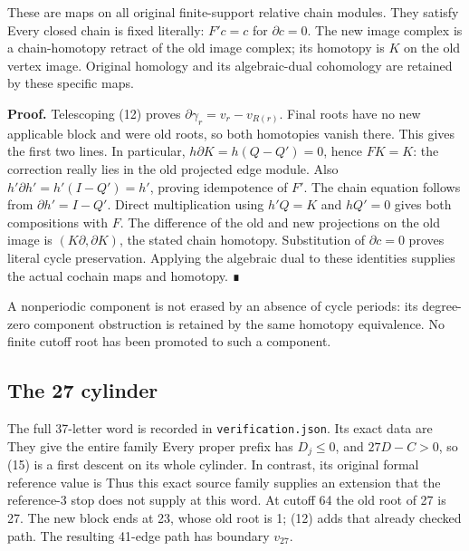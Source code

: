 These are maps on all original finite-support relative chain modules.
They satisfy
Every closed chain is fixed literally: \(F'c=c\) for \(\partial c=0\).
The new image complex is a chain-homotopy retract of the old image
complex; its homotopy is \(K\) on the old vertex image. Original
homology and its algebraic-dual cohomology are retained by these
specific maps.

\textbf{Proof.} Telescoping (12) proves
\(\partial\gamma_r=v_r-v_{R(r)}\). Final roots have no new applicable
block and were old roots, so both homotopies vanish there. This gives
the first two lines. In particular, \(h\partial K=h(Q-Q')=0\), hence
\(FK=K\): the correction really lies in the old projected edge module.
Also \(h'\partial h'=h'(I-Q')=h'\), proving idempotence of \(F'\). The
chain equation follows from \(\partial h'=I-Q'\). Direct multiplication
using \(h'Q=K\) and \(hQ'=0\) gives both compositions with \(F\). The
difference of the old and new projections on the old image is
\((K\partial,\partial K)\), the stated chain homotopy. Substitution of
\(\partial c=0\) proves literal cycle preservation. Applying the
algebraic dual to these identities supplies the actual cochain maps and
homotopy. ∎

A nonperiodic component is not erased by an absence of cycle periods:
its degree-zero component obstruction is retained by the same homotopy
equivalence. No finite cutoff root has been promoted to such a
component.

\subsection{The 27 cylinder}

The full 37-letter word is recorded in \nolinkurl{verification.json}.
Its exact data are  They give the
entire family
Every proper prefix has \(D_j\le0\), and \(27D-C>0\), so (15) is a first
descent on its whole cylinder. In contrast, its original formal
reference value is
 Thus this
exact source family supplies an extension that the reference-3 stop does
not supply at this word. At cutoff 64 the old root of 27 is 27. The new
block ends at 23, whose old root is 1; (12) adds that already checked
path. The resulting 41-edge path has boundary \(v_{27}\).

